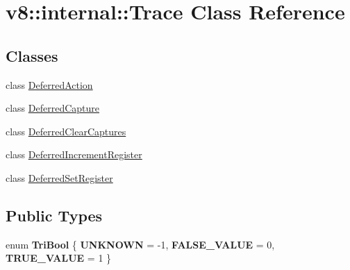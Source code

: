 \hypertarget{classv8_1_1internal_1_1_trace}{}\section{v8\+:\+:internal\+:\+:Trace Class Reference}
\label{classv8_1_1internal_1_1_trace}
\subsection*{Classes}
\begin{DoxyCompactItemize}
\item 
class \hyperlink{classv8_1_1internal_1_1_trace_1_1_deferred_action}{Deferred\+Action}
\item 
class \hyperlink{classv8_1_1internal_1_1_trace_1_1_deferred_capture}{Deferred\+Capture}
\item 
class \hyperlink{classv8_1_1internal_1_1_trace_1_1_deferred_clear_captures}{Deferred\+Clear\+Captures}
\item 
class \hyperlink{classv8_1_1internal_1_1_trace_1_1_deferred_increment_register}{Deferred\+Increment\+Register}
\item 
class \hyperlink{classv8_1_1internal_1_1_trace_1_1_deferred_set_register}{Deferred\+Set\+Register}
\end{DoxyCompactItemize}
\subsection*{Public Types}
\begin{DoxyCompactItemize}
\item 
\hypertarget{classv8_1_1internal_1_1_trace_a91598610521e048135cda64a1be64b99}{}enum {\bfseries Tri\+Bool} \{ {\bfseries U\+N\+K\+N\+O\+W\+N} = -\/1, 
{\bfseries F\+A\+L\+S\+E\+\_\+\+V\+A\+L\+U\+E} = 0, 
{\bfseries T\+R\+U\+E\+\_\+\+V\+A\+L\+U\+E} = 1
 \}\label{classv8_1_1internal_1_1_trace_a91598610521e048135cda64a1be64b99}

\end{DoxyCompactItemize}
